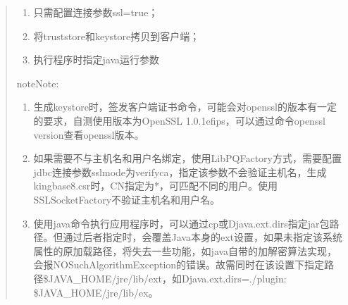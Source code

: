 \documentclass[letterpaper,10pt,english]{sphinxmanual}
\begin{document}
\begin{quote}
\begin{enumerate}
%
\item {} 
只需配置连接参数ssl=true；

\item {} 
将truststore和keystore拷贝到客户端；

\item {} 
执行程序时指定java运行参数

\end{enumerate}

\begin{sphinxVerbatim}[commandchars=\\\{\}]
 
 
\end{sphinxVerbatim}

\begin{sphinxadmonition}{note}{Note:}\begin{enumerate}
%
\item {} 
生成keystore时，签发客户端证书命令，可能会对openssl的版本有一定的要求，自测使用版本为OpenSSL 1.0.1e\sphinxhyphen{}fips，可以通过命令openssl version查看openssl版本。

\item {} 
如果需要不与主机名和用户名绑定，使用LibPQFactory方式，需要配置jdbc连接参数sslmode为verify\sphinxhyphen{}ca，指定该参数不会验证主机名，生成kingbase8.csr时，CN指定为*，可匹配不同的用户。使用SSLSocketFactory不验证主机名和用户名。

\item {} 
使用java命令执行应用程序时，可以通过\sphinxhyphen{}cp或\sphinxhyphen{}Djava.ext.dirs指定jar包路径。但通过后者指定时，会覆盖Java本身的ext设置，如果未指定该系统属性的原加载路径，将失去一些功能，如java自带的加解密算法实现，会报NOSuchAlgorithmException的错误。故需同时在该设置下指定路径\$JAVA\_HOME/jre/lib/ext，如\sphinxhyphen{}Djava.ext.dirs=./plugin: \$JAVA\_HOME/jre/lib/ex。


\end{enumerate}
\end{sphinxadmonition}
\end{quote}
\end{document}
